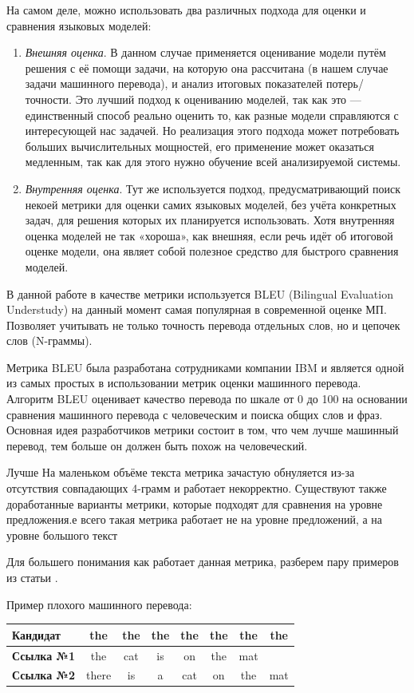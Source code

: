 	На самом деле, можно использовать два различных подхода для оценки и сравнения языковых моделей:
	
	\begin{enumerate}
	    \item \textit{Внешняя оценка}. В данном случае применяется оценивание модели путём решения с её помощи задачи, на которую она рассчитана (в нашем случае задачи машинного перевода), и анализ итоговых показателей потерь/точности. Это лучший подход к оцениванию моделей, так как это — единственный способ реально оценить то, как разные модели справляются с интересующей нас задачей. Но реализация этого подхода может потребовать больших вычислительных мощностей, его применение может оказаться медленным, так как для этого нужно обучение всей анализируемой системы.
	    \item \textit{Внутренняя оценка}. Тут же используется подход, предусматривающий поиск некоей метрики для оценки самих языковых моделей, без учёта конкретных задач, для решения которых их планируется использовать. Хотя внутренняя оценка моделей не так «хороша», как внешняя, если речь идёт об итоговой оценке модели, она являет собой полезное средство для быстрого сравнения моделей.
	\end{enumerate}
	
	В данной работе в качестве метрики используется BLEU (Bilingual Evaluation Understudy) на данный момент самая популярная в современной оценке МП. Позволяет учитывать не только точность перевода отдельных слов, но и цепочек слов (N-граммы).

    Метрика BLEU была разработана сотрудниками компании IBM и является одной из самых простых в использовании метрик оценки машинного перевода. Алгоритм BLEU оценивает качество перевода по шкале от 0 до 100 на основании сравнения машинного перевода с человеческим и поиска общих слов и фраз. Основная идея разработчиков метрики состоит в том, что чем лучше машинный перевод, тем больше он должен быть похож на человеческий.
    
    Лучше На маленьком объёме текста метрика зачастую обнуляется из-за отсутствия совпадающих 4-грамм и работает некорректно. Существуют также доработанные варианты метрики, которые подходят для сравнения на уровне предложения.е всего такая метрика работает не на уровне предложений, а на уровне большого текст
    
    Для большего понимания как работает данная метрика, разберем пару примеров из статьи \cite{15}.
    
    Пример плохого машинного перевода:
    \begin{table}[h]
        \centering
        \begin{tabular}{|l|c|c|c|c|c|c|c|}
        \hline
        \textbf{Кандидат}  & the   & the & the & the & the & the & the \\ \hline
        \textbf{Ссылка №1} & the   & cat & is  & on  & the & mat &     \\ \hline
        \textbf{Ссылка №2} & there & is  & a   & cat & on  & the & mat \\ \hline
        \end{tabular}
    \end{table}
    
